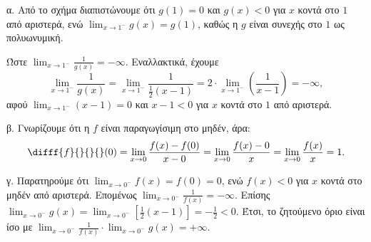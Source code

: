 \begin{alist}
    \item α. Από το σχήμα διαπιστώνουμε ότι $g(1) = 0$ και $g(x) < 0$ για $x$ κοντά στο $1$ από αριστερά,
    ενώ $\lim_{x \to 1^-} g(x) = g(1)$, καθώς η $g$ είναι συνεχής στο $1$ ως πολυωνυμική.

    Ώστε $\lim_{x \to 1^-} \frac{1}{g(x)} = -\infty.$
    Εναλλακτικά, έχουμε
    \[ \lim_{x \to 1^-} \frac{1}{g(x)} = \lim_{x \to 1^-} \frac{1}{\frac{1}{2}(x-1)} = 2 \cdot \lim_{x \to 1^-} \left(\frac{1}{x-1}\right) = -\infty, \]
    αφού $\lim_{x \to 1^-} (x-1) = 0$ και $x - 1 < 0$ για $x$ κοντά στο $1$ από αριστερά.

    \item β. Γνωρίζουμε ότι η $f$ είναι παραγωγίσιμη στο μηδέν, άρα:
    \[ \difff{f}{}{}{}(0) = \lim_{x \to 0} \frac{f(x)-f(0)}{x-0} = \lim_{x \to 0} \frac{f(x)-0}{x} = \lim_{x \to 0} \frac{f(x)}{x} = 1. \]

    \item γ. Παρατηρούμε ότι $\lim_{x \to 0^-} f(x) = f(0) = 0$, ενώ $f(x) < 0$ για $x$ κοντά στο μηδέν από
    αριστερά. Επομένως $\lim_{x \to 0^-} \frac{1}{f(x)} = -\infty.$
    Επίσης $\lim_{x \to 0^-} g(x) = \lim_{x \to 0^-} \left[\frac{1}{2}(x - 1)\right] = -\frac{1}{2} < 0.$
    Έτσι, το ζητούμενο όριο είναι ίσο με $\lim_{x \to 0^-} \frac{1}{f(x)} \cdot \lim_{x \to 0^-} g(x) = +\infty.$
\end{alist}